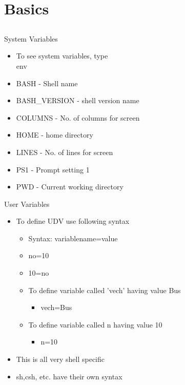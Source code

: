 \documentclass{beamer}
\begin{document}
\section{Basics}
\subsection{}

\begin{frame}{System Variables}
\begin{itemize}
\item To see system variables, type \\
env
\item BASH - Shell name
\item BASH\_VERSION - shell version name
\item COLUMNS - No. of columns for screen
\item HOME - home directory
\item LINES - No. of lines for screen
\item PS1 - Prompt setting 1
\item PWD - Current working directory
\end{itemize}
\end{frame}

\begin{frame}{User Variables}
\begin{itemize}
\item To define UDV use following syntax
\begin{itemize}
\item Syntax: variablename=value
\item no=10
\item 10=no
\item To define variable called 'vech' having value Bus
\begin{itemize}
\item vech=Bus
\end{itemize}
\item To define variable called n having value 10
\begin{itemize}
\item n=10
\end{itemize}
\end{itemize}
\item This is all very shell specific
\item sh,csh, etc. have their own syntax
\end{itemize}
\end{frame}
\end{document}
